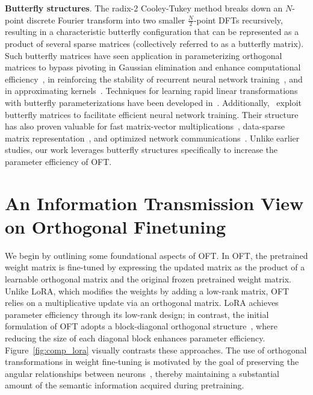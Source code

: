\textbf{Butterfly structures}. The radix-2 Cooley-Tukey method breaks down an $N$-point discrete Fourier transform into two smaller $\frac{N}{2}$-point DFTs recursively, resulting in a characteristic butterfly configuration that can be represented as a product of several sparse matrices (collectively referred to as a butterfly matrix). Such butterfly matrices have seen application in parameterizing orthogonal matrices to bypass pivoting in Gaussian elimination and enhance computational efficiency~\cite{parker1995random}, in reinforcing the stability of recurrent neural network training~\cite{jing2017tunable}, and in approximating kernels~\cite{munkhoeva2018quadrature}. Techniques for learning rapid linear transformations with butterfly parameterizations have been developed in~\cite{dao2019learning,dao2019kaleidoscope}. Additionally,~\cite{chen2022pixelated,dao2022monarch} exploit butterfly matrices to facilitate efficient neural network training. Their structure has also proven valuable for fast matrix-vector multiplications~\cite{michielssen1996multilevel,o2010algorithm}, data-sparse matrix representation~\cite{li2015butterfly}, and optimized network communications~\cite{klasing1994broadcasting,li2003linear,rajasingh2016transmission}. Unlike earlier studies, our work leverages butterfly structures specifically to increase the parameter efficiency of OFT.

\section{An Information Transmission View on Orthogonal Finetuning}

We begin by outlining some foundational aspects of OFT. In OFT, the pretrained weight matrix is fine-tuned by expressing the updated matrix as the product of a learnable orthogonal matrix and the original frozen pretrained weight matrix. Unlike LoRA, which modifies the weights by adding a low-rank matrix, OFT relies on a multiplicative update via an orthogonal matrix. LoRA achieves parameter efficiency through its low-rank design; in contrast, the initial formulation of OFT adopts a block-diagonal orthogonal structure~\cite{qiu2023controlling}, where reducing the size of each diagonal block enhances parameter efficiency. Figure~\ref{fig:comp_lora} visually contrasts these approaches. The use of orthogonal transformations in weight fine-tuning is motivated by the goal of preserving the angular relationships between neurons~\cite{liu2018learning,liu2021orthogonal,qiu2023controlling}, thereby maintaining a substantial amount of the semantic information acquired during pretraining.

